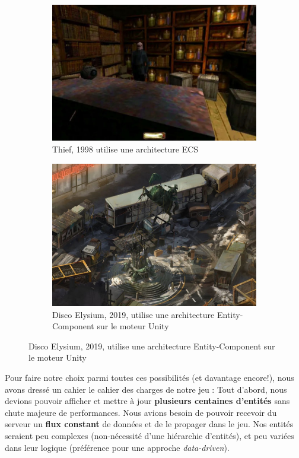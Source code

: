     \begin{figure}[!h]
    \centering
    \begin{subfigure}{0.4\linewidth}
        \centering
        \includegraphics[width=\linewidth]{images/thief.jpg}
        \caption{Thief, 1998 utilise une architecture ECS}
    \end{subfigure}
    \hfill
    \begin{subfigure}{0.4\linewidth}
        \centering
        \includegraphics[width=\linewidth]{images/discoelysium-jpeg.jpeg}
        \caption{Disco Elysium, 2019, utilise une architecture Entity-Component sur le moteur Unity}
    \end{subfigure}
\end{figure}

Pour faire notre choix parmi toutes ces possibilités (et davantage encore!), nous avons dressé un cahier le cahier des charges de notre jeu : Tout d'abord, nous devions pouvoir afficher et mettre à jour \textbf{plusieurs centaines d'entités} sans chute majeure de performances. Nous avions besoin de pouvoir recevoir du serveur un \textbf{flux constant} de données et de le propager dans le jeu. Nos entités seraient peu complexes (non-nécessité d'une hiérarchie d'entités), et peu variées dans leur logique (préférence pour une approche \textit{data-driven}).





